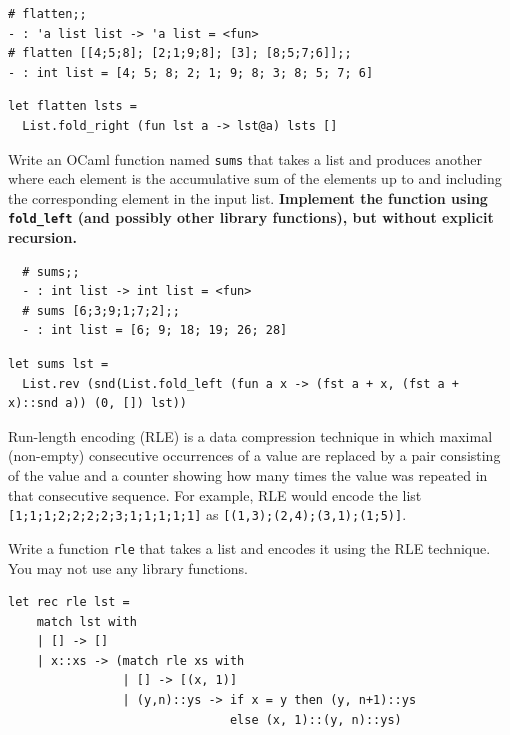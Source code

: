 \documentclass[addpoints]{exam}
\begin{document}
\begin{questions}
  \begin{verbatim}
# flatten;; 
- : 'a list list -> 'a list = <fun>
# flatten [[4;5;8]; [2;1;9;8]; [3]; [8;5;7;6]];;
- : int list = [4; 5; 8; 2; 1; 9; 8; 3; 8; 5; 7; 6]
  \end{verbatim}

  \begin{solutionbox}{2cm}
    \begin{verbatim}
let flatten lsts =
  List.fold_right (fun lst a -> lst@a) lsts []
    \end{verbatim}
  \end{solutionbox}

  
  \question
  Write an OCaml function named \texttt{sums}
  that takes a list and produces another where
  each element is the accumulative
  sum of the elements up to and including the corresponding element in the input list.
  \textbf{Implement the function using \texttt{fold\_left} (and possibly
  other library functions), but without explicit recursion.}

  \begin{verbatim}
  # sums;;
  - : int list -> int list = <fun>
  # sums [6;3;9;1;7;2];;
  - : int list = [6; 9; 18; 19; 26; 28]
  \end{verbatim}
  
  \begin{solutionbox}{2cm}
    \begin{verbatim}
let sums lst =
  List.rev (snd(List.fold_left (fun a x -> (fst a + x, (fst a + x)::snd a)) (0, []) lst))
    \end{verbatim}
  \end{solutionbox}

  \question
  Run-length encoding (RLE) is a data compression technique
  in which maximal (non-empty) consecutive
  occurrences of a value are replaced by a pair consisting
  of the value and a counter showing how many times
  the value was repeated in that consecutive sequence.
  For example, RLE would encode the list
  \texttt{[1;1;1;2;2;2;2;3;1;1;1;1;1]}
  as \texttt{[(1,3);(2,4);(3,1);(1;5)]}.

  Write a function \texttt{rle} that takes a list
  and encodes it using the RLE technique.
  You may not use any library functions.

  \begin{solutionbox}{4cm}
    \begin{verbatim}
let rec rle lst =
    match lst with
    | [] -> []
    | x::xs -> (match rle xs with
                | [] -> [(x, 1)]
                | (y,n)::ys -> if x = y then (y, n+1)::ys
                               else (x, 1)::(y, n)::ys)
    \end{verbatim}
  \end{solutionbox}



\end{questions}
\end{document}
